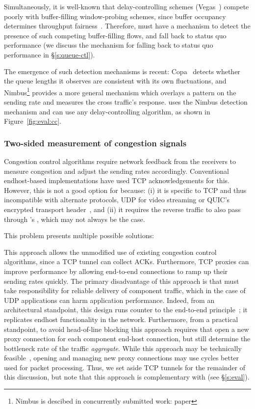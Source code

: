 Simultaneously, it is well-known that delay-controlling schemes (\eg Vegas~\cite{vegas}) compete poorly with buffer-filling window-probing schemes, since buffer occupancy determines throughput fairness~\cite{Jacobson88}. 
Therefore, \name must have a mechanism to detect the presence of such competing buffer-filling flows, and fall back to status quo performance (we discuss the mechanism for falling back to status quo performance in \S\ref{s:queue-ctl}).

The emergence of such detection mechanisms is recent: Copa~\cite{copa} detects whether the queue lengths it observes are consistent with its own fluctuations, and Nimbus\footnote{Nimbus is descibed in concurrently submitted work: paper } provides a more general mechanism which overlays a pattern on the sending rate and measures the cross traffic's response.
\name uses the Nimbus detection mechanism and can use any delay-controlling algorithm, as shown in Figure~\ref{fig:eval:cc}.

\subsubsection{Two-sided measurement of congestion signals}\label{s:design:twosided}
Congestion control algorithms require network feedback from the receivers to measure congestion and adjust the sending rates accordingly. 
Conventional endhost-based implementations have used TCP acknowledgements for this.
However, this is not a good option for \name because: 
(i) it is specific to TCP and thus incompatible with alternate protocols, \ie UDP for video streaming or QUIC's encrypted transport header~\cite{quic}, 
and (ii) it requires the reverse traffic to also pass through \name's \inbox, which may not always be the case.  

This problem presents multiple possible solutions:

 This approach allows the unmodified use of existing congestion control algorithms, since a TCP tunnel can collect ACKs. Furthermore, TCP proxies can improve performance by allowing end-to-end connections to ramp up their sending rates quickly.
The primary disadvantage of this approach is that \name must take responsibility for reliable delivery of component traffic, which in the case of UDP applications can harm application performance. 
Indeed, from an architectural standpoint, this design runs counter to the end-to-end principle~\cite{e2e-principle}; it replicates endhost functionality in the network.
Furthermore, from a practical standpoint, to avoid head-of-line blocking this approach requires that \name open a new proxy connection for each component end-host connection, but still determine the bottleneck rate of the traffic \emph{aggregate}. While this approach may be technically feasible~\cite{cm}, opening and managing new proxy connections may use cycles better used for packet processing.
Thus, we set aside TCP tunnels for the remainder of this discussion, but note that this approach is complementary with \name (see \S\ref{s:eval}).

